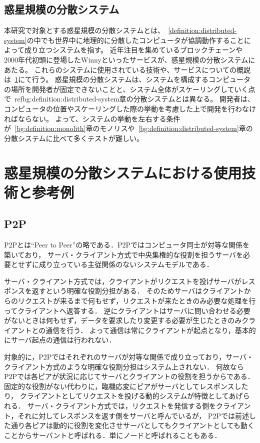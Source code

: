 \subsection{惑星規模の分散システム}
\label{bg:definition:planetary-scale-distributed-system}

本研究で対象とする惑星規模の分散システムとは、~\ref{definition:distributed-system}の中でも世界中に地理的に分散したコンピュータが協調動作することによって成り立つシステムを指す。
近年注目を集めているブロックチェーンや2000年代初頭に登場したWinnyといったサービスが、惑星規模の分散システムにあたる。
これらのシステムに使用されている技術や、サービスについての概説は~\ref{bg:planetary-scale-distributed-system}にて行う。
惑星規模の分散システムは、システムを構成するコンピュータの場所を開発者が固定できないことと、システム全体がスケーリングしていく点で~ref{bg:definition:distributed-system}章の分散システムとは異なる。
開発者は、コンピュータの位置やスケーリングした際の挙動を考慮した上で開発を行わなければならない。
よって、システムの挙動を左右する条件が~\ref{bg:definition:monolith}章のモノリスや~\ref{bg:definition:distributed-system}章の分散システムに比べて多くテストが難しい。

\section{惑星規模の分散システムにおける使用技術と参考例}
\label{bg:planetary-scale-distributed-system}

\subsection{P2P}
\label{bg:planetary-scale-distributed-system:p2p}

P2Pとは``Peer to Peer''の略である．P2Pではコンピュータ同士が対等な関係を築いており，
サーバ・クライアント方式で中央集権的な役割を担うサーバを必要とせずに成り立っている主従関係のないシステムモデルである．

サーバ・クライアント方式では，クライアントがリクエストを投げサーバがレスポンスを返すという明確な役割分担がある．
そのためサーバはクライアントからのリクエストが来るまで何もせず，リクエストが来たときのみ必要な処理を行ってクライアントへ返答する．
逆にクライアントはサーバに問い合わせる必要がないときは何もせず，データを要求したり変更する必要が生じたときのみクライアントとの通信を行う．
よって通信は常にクライアントが起点となり，基本的にサーバ起点の通信は行われない．

対象的に，P2Pではそれぞれのサーバが対等な関係で成り立っており，サーバ・クライアント方式のような明確な役割分担はシステム上されない．
何故ならP2Pでは各ピアが状況に応じてサーバとクライアントの役割を担うからである．固定的な役割がない代わりに，臨機応変にピアがサーバとしてレスポンスしたり，
クライアントとしてリクエストを投げる動的システムが特徴としてあげられる．
サーバ・クライアント方式では，リクエストを発信する側をクライアント，それに対してレスポンスを返す側をサーバと呼んでいるが，
P2Pでは前述した通り各ピアは動的に役割を変化させサーバとしてもクライアントとしても動くことからサーバントと呼ばれる．単にノードと呼ばれることもある．

